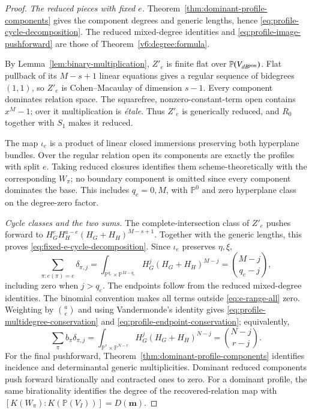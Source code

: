 \documentclass[10pt,fleqn]{article}
\numberwithin{equation}{section}
\newcommand{\PP}{\mathbb P}
\begin{document}
\begin{proof}
\emph{The reduced pieces with fixed $e$.}
Theorem~\ref{thm:dominant-profile-components} gives the component degrees
and generic lengths, hence \eqref{eq:profile-cycle-decomposition}.
The reduced mixed-degree identities and
\eqref{eq:profile-image-pushforward} are those of
Theorem~\ref{v6:degree:formula}.

By Lemma~\ref{lem:binary-multiplication}, $Z'_e$ is finite flat over
$\PP(V_{dB^{\rm prim}})$.  Flat pullback of its $M-s+1$ linear equations
gives a regular sequence of bidegrees $(1,1)$, so $Z'_e$ is
Cohen--Macaulay of dimension $s-1$.  Every component dominates relation
space.  The squarefree, nonzero-constant-term open contains $x^M-1$;
over it multiplication is \emph{\'etale}.  Thus $Z'_e$ is generically
reduced, and $R_0$ together with $S_1$ makes it reduced.

The map $\iota_e$ is a product of linear closed immersions preserving
both hyperplane bundles.  Over the regular relation open its components
are exactly the profiles with split $e$.  Taking reduced closures
identifies them scheme-theoretically with the corresponding $W_\pi$;
no boundary component is omitted since every component dominates the
base.  This includes $q_e=0,M$, with $\PP^0$ and zero hyperplane class
on the degree-zero factor.

\emph{Cycle classes and the two sums.}
The complete-intersection class of $Z'_e$ pushes forward to
$H_G^eH_H^{a-e}(H_G+H_H)^{M-s+1}$.  Together with the generic lengths,
this proves \eqref{eq:fixed-e-cycle-decomposition}.  Since $\iota_e$
preserves $\eta,\xi$,
\[
 \sum_{\pi:e(\pi)=e}\delta_{\pi,j}
 =\int_{\PP^{q_e}\times\PP^{M-q_e}}
        H_G^j(H_G+H_H)^{M-j}
 =\binom{M-j}{q_e-j},
\]
including zero when $j>q_e$.  The endpoints follow from the reduced mixed-degree identities.  The binomial convention makes all terms
outside \eqref{eq:e-range-all} zero.  Weighting by $\binom ae$ and
using Vandermonde's identity gives \eqref{eq:profile-multidegree-conservation}
and \eqref{eq:profile-endpoint-conservation}; equivalently,
\begin{equation}\label{eq:profile-conservation-intersection}
 \sum_\pi b_\pi\delta_{\pi,j}
 =\int_{\PP^r\times\PP^{N-r}}H_G^j(H_G+H_H)^{N-j}
 =\binom{N-j}{r-j}.
\end{equation}
For the final pushforward, Theorem~\ref{thm:dominant-profile-components}
identifies incidence and determinantal generic multiplicities.
Dominant reduced components push forward birationally and contracted
ones to zero.  For a dominant profile, the same birationality identifies
the degree of the recovered-relation map with
$[K(W_\pi):K(\PP(V_I))]=D(\boldsymbol m)$.
\end{proof}
\end{document}
